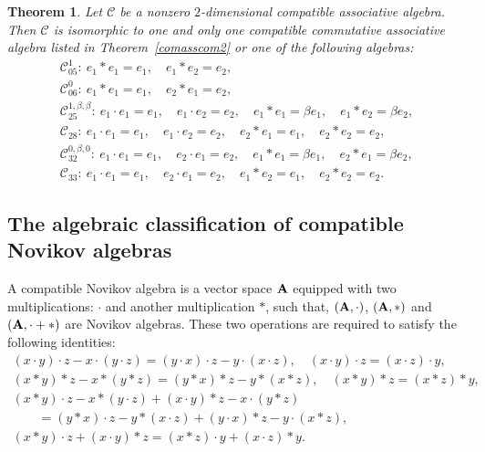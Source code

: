 \documentclass[pdftex]{sigma}
\numberwithin{equation}{section}
\newtheorem{Theorem}{Theorem}[section]
\begin{document}
\begin{Theorem}
\label{comass2}
Let $\mathcal{C}$ be a nonzero $2$-dimensional compatible associative algebra.
Then $\mathcal{C}$ is isomorphic to one and only one compatible commutative associative algebra listed in Theorem~{\rm\ref{comasscom2}} or one of the following algebras:
\begin{gather*}
\mathcal{C}_{05}^{1}\colon\ e_{1}\ast e_{1} =e_{1},\quad e_{1}\ast e_{2} = e_{2},\\
\mathcal{C}_{06}^{0}\colon\ e_{1} \ast e_{1} =e_{1}, \quad e_{2} \ast e_{1} =e_{2},\\
\mathcal{C}_{25}^{1 ,\beta , \beta }\colon\
e_{1}\cdot e_{1}=e_{1}, \quad e_{1}\cdot e_{2}= e_{2}, \quad
e_{1}\ast e_{1}=\beta e_{1}, \quad e_{1}\ast e_{2}=\beta e_{2},
\\
\mathcal{C}_{28}\colon\
e_{1}\cdot e_{1}=e_{1}, \quad e_{1}\cdot e_{2}=e_{2}, \quad
e_{2}\ast e_{1}=e_{1}, \quad e_{2}\ast e_{2}=e_{2},
\\
\mathcal{C}_{32}^{0 ,\beta ,0 }\colon\
e_{1}\cdot e_{1}=e_{1}, \quad e_{2}\cdot
e_{1}=e_{2}, \quad
e_{1}\ast e_{1}=\beta e_{1}, \quad
e_{2}\ast e_{1}=\beta e_{2},
\\
\mathcal{C}_{33}\colon\
e_{1}\cdot e_{1}=e_{1}, \quad e_{2}\cdot e_{1}=e_{2}, \quad
e_{1}\ast e_{2}=e_{1}, \quad e_{2}\ast e_{2}=e_{2}.
\end{gather*}
\end{Theorem}

\subsection{The algebraic classification of compatible Novikov algebras}

\begin{Definition}
A compatible Novikov algebra is a vector space ${\bf A}$ equipped with
two multiplications: $\cdot$ and another multiplication $\ast$,
such that, $({\bf A}, \cdot)$, $({\bf A}, \ast)$ and
$({\bf A}, \cdot+ \ast)$ are Novikov algebras.
These two operations are required to satisfy the following identities:
\begin{gather*}
 ( x\cdot y) \cdot z-x\cdot ( y\cdot
z) = ( y\cdot x) \cdot z -y\cdot ( x\cdot z) ,\quad
 (x \cdot y) \cdot z = (x \cdot z)\cdot y, \\
 ( x\ast y) \ast z-x\ast ( y\ast
z) = ( y\ast x) \ast z -y\ast ( x\ast z) ,\quad
 (x \ast y) \ast z = (x \ast z)\ast y, \\
(x\ast y)\cdot z-x\ast (y\cdot z)+(x\cdot y)\ast z-x\cdot (y\ast z) \\
\qquad =
(y\ast x)\cdot z-y\ast (x\cdot z)+(y\cdot x)\ast z-y\cdot (x\ast z) ,\\
 (x \ast y) \cdot z +(x \cdot y) \ast z = (x \ast z)\cdot y+(x \cdot z)\ast y.
 \end{gather*}
 \end{Definition}
\end{document}
